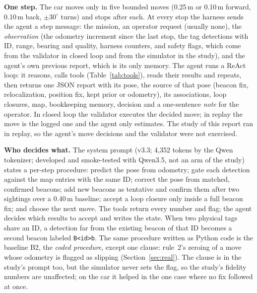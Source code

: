 \documentclass[conference]{IEEEtran}
\begin{document}


\textbf{One step.} The car moves only in five bounded moves (0.25\,m or 0.10\,m forward, 0.10\,m back, $\pm30^\circ$
turns) and stops after each. At every stop the harness sends the agent a step message: the mission, an
operator request (usually none), the \emph{observation} (the odometry increment since the last stop, the tag
detections with ID, range, bearing and quality, harness counters, and safety flags, which come from the validator in closed loop and from the simulator in
the study),
and the agent's own previous report, which is its only memory. The agent runs a ReAct loop: it reasons, calls
tools (Table~\ref{tab:tools}), reads their results and repeats, then returns one JSON report with its pose,
the source of that pose (beacon fix, relocalization, position fix, kept prior or odometry), its associations, loop closures,
map, bookkeeping memory, decision and a one-sentence \emph{note} for the operator. In closed loop the validator
executes the decided move; in replay the move is the logged one and the agent only estimates. The study of
this report ran in replay, so the agent's move decisions and the validator were not exercised.



\textbf{Who decides what.} The system prompt (v3.3; 4,352 tokens by the Qwen tokenizer; developed and smoke-tested with Qwen3.5, not an arm of the study)
states a per-step procedure: predict the pose
from odometry; gate each detection against the map entries with the same ID; correct the pose from matched,
confirmed beacons; add new beacons as tentative and confirm them after two sightings over a 0.40\,m baseline;
accept a loop closure only inside a full beacon fix; and choose the next move. The tools return every number
and flag; the agent decides which results to accept and writes the state. When two physical tags share an ID,
a detection far from the existing beacon of that ID becomes a second beacon labeled \texttt{B<id>b}. The same
procedure written as Python code is the baseline B2, the \emph{coded procedure}, except one clause: rule~2's
zeroing of a move whose odometry is flagged as slipping (Section~\ref{sec:real}). The clause is in the study's prompt
too, but the simulator never sets the flag, so the study's fidelity numbers are unaffected; on the car it helped in
the one case where no fix followed at once.
\end{document}
